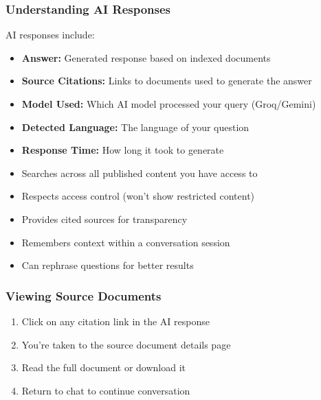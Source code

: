 \documentclass[12pt,a4paper]{article}
\begin{document}
\subsubsection{Understanding AI Responses}
AI responses include:
\begin{itemize}[leftmargin=*]
    \item \textbf{Answer:} Generated response based on indexed documents
    \item \textbf{Source Citations:} Links to documents used to generate the answer
    \item \textbf{Model Used:} Which AI model processed your query (Groq/Gemini)
    \item \textbf{Detected Language:} The language of your question
    \item \textbf{Response Time:} How long it took to generate
\end{itemize}

\begin{tcolorbox}[colback=blue!5!white,colframe=primarycolor,title=AI Capabilities]
\begin{itemize}[leftmargin=*]
    \item Searches across all published content you have access to
    \item Respects access control (won't show restricted content)
    \item Provides cited sources for transparency
    \item Remembers context within a conversation session
    \item Can rephrase questions for better results
\end{itemize}
\end{tcolorbox}

\newpage

\subsubsection{Viewing Source Documents}
\begin{enumerate}[leftmargin=*]
    \item Click on any citation link in the AI response
    \item You're taken to the source document details page
    \item Read the full document or download it
    \item Return to chat to continue conversation
\end{enumerate}
\end{document}
